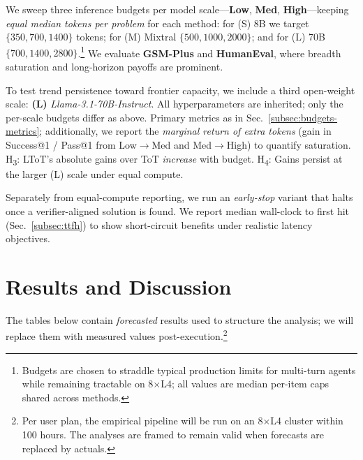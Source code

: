 \documentclass{article}
\begin{document}
We sweep three inference budgets per model scale—\textbf{Low}, \textbf{Med}, \textbf{High}—keeping \emph{equal median tokens per problem} for each method:
for (S) 8B we target $\{350,700,1400\}$ tokens; for (M) Mixtral $\{500,1000,2000\}$; and for (L) 70B $\{700,1400,2800\}$.\footnote{Budgets are chosen to straddle typical production limits for multi-turn agents while remaining tractable on 8$\times$L4; all values are median per-item caps shared across methods.}
We evaluate \textbf{GSM-Plus} and \textbf{HumanEval}, where breadth saturation and long-horizon payoffs are prominent.

To test trend persistence toward frontier capacity, we include a third open-weight scale:
\textbf{(L)} \emph{Llama-3.1-70B-Instruct}.
All hyperparameters are inherited; only the per-scale budgets differ as above.
Primary metrics as in Sec.~\ref{subsec:budgets-metrics}; additionally, we report the \emph{marginal return of extra tokens} (gain in Success@1 / Pass@1 from Low$\to$Med and Med$\to$High) to quantify saturation.
H\textsubscript{3}: LToT's absolute gains over ToT \emph{increase} with budget.
H\textsubscript{4}: Gains persist at the larger (L) scale under equal compute.

Separately from equal-compute reporting, we run an \emph{early-stop} variant that halts once a verifier-aligned solution is found.
We report median wall-clock to first hit (Sec.~\ref{subsec:ttfh}) to show short-circuit benefits under realistic latency objectives.

\section{Results and Discussion}
\label{section:results}

The tables below contain \emph{forecasted} results used to structure the analysis; we will replace them with measured values post-execution.\footnote{Per user plan, the empirical pipeline will be run on an 8$\times$L4 cluster within 100 hours. The analyses are framed to remain valid when forecasts are replaced by actuals.}
\end{document}
